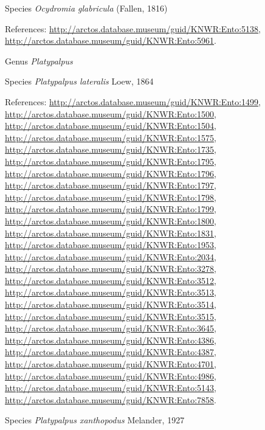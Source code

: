 \documentclass[9pt, article]{memoir}
\begin{document}
\begin{multicols}{2}
\vspace{6pt}\noindent\hspace{36pt}Species \textit{Ocydromia glabricula} (Fallen, 1816)


\vspace{6pt}References: 
\url{http://arctos.database.museum/guid/KNWR:Ento:5138}, 
\url{http://arctos.database.museum/guid/KNWR:Ento:5961}.

\vspace{6pt}\noindent\hspace{30pt}Genus \textit{Platypalpus}


\vspace{6pt}\noindent\hspace{36pt}Species \textit{Platypalpus lateralis} Loew, 1864


\vspace{6pt}References: 
\url{http://arctos.database.museum/guid/KNWR:Ento:1499}, 
\url{http://arctos.database.museum/guid/KNWR:Ento:1500}, 
\url{http://arctos.database.museum/guid/KNWR:Ento:1504}, 
\url{http://arctos.database.museum/guid/KNWR:Ento:1575}, 
\url{http://arctos.database.museum/guid/KNWR:Ento:1735}, 
\url{http://arctos.database.museum/guid/KNWR:Ento:1795}, 
\url{http://arctos.database.museum/guid/KNWR:Ento:1796}, 
\url{http://arctos.database.museum/guid/KNWR:Ento:1797}, 
\url{http://arctos.database.museum/guid/KNWR:Ento:1798}, 
\url{http://arctos.database.museum/guid/KNWR:Ento:1799}, 
\url{http://arctos.database.museum/guid/KNWR:Ento:1800}, 
\url{http://arctos.database.museum/guid/KNWR:Ento:1831}, 
\url{http://arctos.database.museum/guid/KNWR:Ento:1953}, 
\url{http://arctos.database.museum/guid/KNWR:Ento:2034}, 
\url{http://arctos.database.museum/guid/KNWR:Ento:3278}, 
\url{http://arctos.database.museum/guid/KNWR:Ento:3512}, 
\url{http://arctos.database.museum/guid/KNWR:Ento:3513}, 
\url{http://arctos.database.museum/guid/KNWR:Ento:3514}, 
\url{http://arctos.database.museum/guid/KNWR:Ento:3515}, 
\url{http://arctos.database.museum/guid/KNWR:Ento:3645}, 
\url{http://arctos.database.museum/guid/KNWR:Ento:4386}, 
\url{http://arctos.database.museum/guid/KNWR:Ento:4387}, 
\url{http://arctos.database.museum/guid/KNWR:Ento:4701}, 
\url{http://arctos.database.museum/guid/KNWR:Ento:4986}, 
\url{http://arctos.database.museum/guid/KNWR:Ento:5143}, 
\url{http://arctos.database.museum/guid/KNWR:Ento:7858}.

\vspace{6pt}\noindent\hspace{36pt}Species \textit{Platypalpus xanthopodus} Melander, 1927



\end{multicols}
\end{document}
